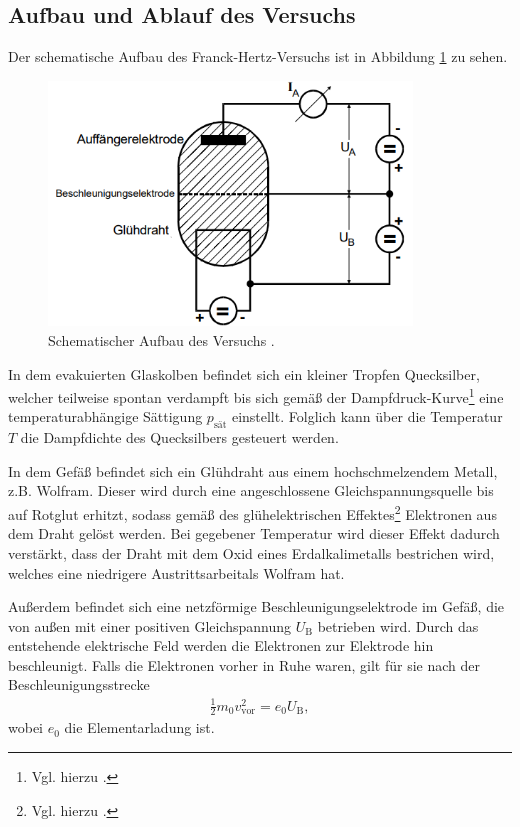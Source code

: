 \subsection{Aufbau und Ablauf des Versuchs}
\label{sec:aufbau-ablauf}
Der schematische Aufbau des Franck-Hertz-Versuchs ist in Abbildung \ref{fig:schematischer_aufbau} zu sehen.
\begin{figure}[H]
    \centering
    \includegraphics[height = 6.5cm]{bilder/schema.png}
    \caption{Schematischer Aufbau des Versuchs \cite{man:v601}.}
    \label{fig:schematischer_aufbau}
\end{figure}
\noindent
In dem evakuierten Glaskolben befindet sich ein kleiner Tropfen Quecksilber, welcher teilweise spontan verdampft bis sich gemäß der 
Dampfdruck-Kurve\footnote[2]{Vgl. hierzu \cite{man:v203}.} eine temperaturabhängige Sättigung $p_\text{sät}$ einstellt.
Folglich kann über die Temperatur $T$ die Dampfdichte des Quecksilbers gesteuert werden.

\noindent
In dem Gefäß befindet sich ein Glühdraht aus einem hochschmelzendem Metall, z.B. Wolfram.
Dieser wird durch eine angeschlossene Gleichspannungsquelle bis auf Rotglut erhitzt, 
sodass gemäß des glühelektrischen Effektes\footnote[3]{Vgl. hierzu \cite{man:v504}.} Elektronen aus dem Draht gelöst werden.
Bei gegebener Temperatur wird dieser Effekt dadurch verstärkt, dass der Draht mit dem Oxid eines Erdalkalimetalls bestrichen wird,
welches eine niedrigere Austrittsarbeit\footnotemark[3] als Wolfram hat.

\noindent
Außerdem befindet sich eine netzförmige Beschleunigungselektrode im Gefäß, die von außen mit einer positiven Gleichspannung $U_\text{B}$
betrieben wird.
Durch das entstehende elektrische Feld werden die Elektronen zur Elektrode hin beschleunigt.
Falls die Elektronen vorher in Ruhe waren, gilt für sie nach der Beschleunigungsstrecke
\begin{align}
    \frac{1}{2} m_0 v^2_\text{vor} = e_0 U_\text{B}, 
    \label{eq:beschleunigung}
\end{align}
\noindent wobei $e_0$ die Elementarladung ist.

